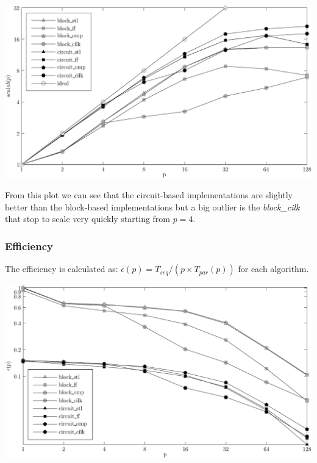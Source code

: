 \documentclass{article}
\begin{document}
\begin{center}
\begin{minipage}{0.75\linewidth}
\includegraphics[width=\linewidth]{img/scalability}
\end{minipage}
\end{center}

From this plot we can see that the circuit-based implementations are slightly better than the block-based implementations but a big outlier is the \textit{block\_cilk} that stop to scale very quickly starting from $p = 4$. 

\subsubsection{Efficiency}

The efficiency is calculated as: $\epsilon(p) = T_{seq} / (p \times T_{par}(p) )$ for each algorithm.

\begin{center}
\begin{minipage}{0.75\linewidth}
\includegraphics[width=\linewidth]{img/efficiency}
\end{minipage}
\end{center}
\end{document}
